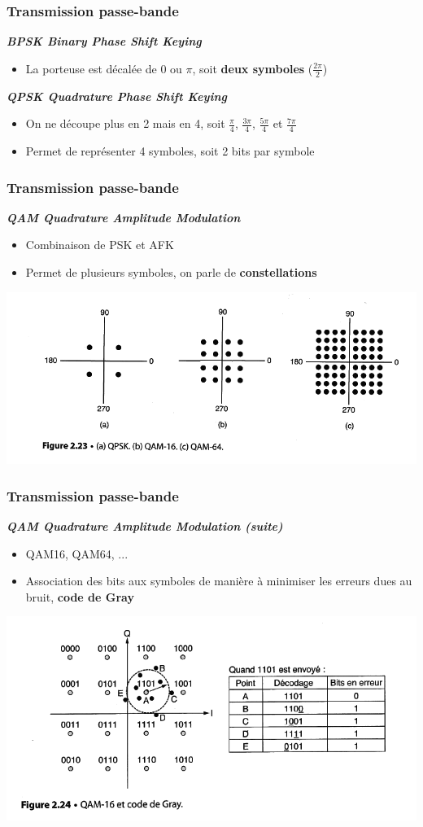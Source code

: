 \begin{frame}[fragile]
	\frametitle{Transmission passe-bande}
{\large\bf \textit{BPSK Binary Phase Shift Keying}}
\begin{itemize}
	\item La porteuse est décalée de 0 ou $\pi$, soit \textbf{deux symboles}
	($\frac{2\pi}{2}$)
\end{itemize}
\vspace{1cm}
{\large\bf \textit{QPSK Quadrature Phase Shift Keying}}
\begin{itemize}
	\item On ne découpe plus en 2 mais en 4, soit 
	$\frac{\pi}{4}$, $\frac{3\pi}{4}$, $\frac{5\pi}{4}$ et $\frac{7\pi}{4}$
	\item Permet de représenter 4 symboles, soit 2 bits par symbole
\end{itemize}
\end{frame}

\begin{frame}[fragile]
	\frametitle{Transmission passe-bande}
{\large\bf \textit{QAM Quadrature Amplitude Modulation}}
\begin{itemize}
	\item Combinaison de PSK et AFK
	\item Permet de plusieurs symboles, on parle de \textbf{constellations}
\end{itemize}
\begin{center}
	\includegraphics[width=.6\linewidth]{img/2-23.png}
\end{center}
\end{frame}

\begin{frame}[fragile]
	\frametitle{Transmission passe-bande}
{\large\bf \textit{QAM Quadrature Amplitude Modulation (suite)}}
\begin{itemize}
	\item QAM16, QAM64, ...
	\item Association des bits aux symboles de manière à minimiser 
	les erreurs dues au bruit, \textbf{code de Gray}
\end{itemize}
\begin{center}
	\includegraphics[width=.8\linewidth]{img/2-24.png}
\end{center}
\end{frame}

